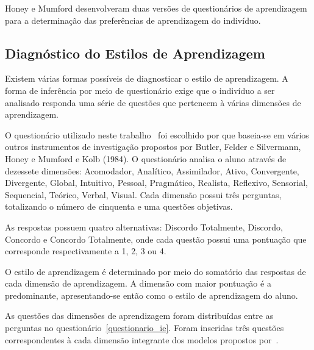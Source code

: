 Honey e Mumford desenvolveram duas versões de questionários de aprendizagem~\cite{honey2000} para a determinação das preferências de aprendizagem do indivíduo.

\subsection{Diagnóstico do Estilos de Aprendizagem}
Existem várias formas possíveis de diagnosticar o estilo de aprendizagem. A forma de inferência por meio de questionário exige que o indivíduo a ser analisado responda uma série de questões que pertencem à várias dimensões de aprendizagem.

O questionário utilizado neste trabalho~\cite{muhlbeier12} foi escolhido por que baseia-se em vários outros instrumentos de investigação propostos por Butler, Felder e Silvermann, Honey e Mumford e Kolb (1984). O questionário analisa o aluno através de dezessete dimensões: Acomodador, Analítico, Assimilador, Ativo, Convergente, Divergente, Global, Intuitivo, Pessoal, Pragmático, Realista, Reflexivo, Sensorial, Sequencial, Teórico, Verbal, Visual. Cada dimensão possui três perguntas, totalizando o número de cinquenta e uma questões objetivas.

As respostas possuem quatro alternativas: Discordo Totalmente, Discordo, Concordo e Concordo Totalmente, onde cada questão possui uma pontuação que corresponde respectivamente a 1, 2, 3 ou 4.

O estilo de aprendizagem é determinado por meio do somatório das respostas de cada dimensão de aprendizagem. A dimensão com maior pontuação é a predominante, apresentando-se então como o estilo de aprendizagem do aluno. 

As questões das dimensões de aprendizagem foram distribuídas entre as perguntas no questionário~\ref{questionario_ie}. Foram inseridas três questões correspondentes à cada dimensão integrante dos modelos propostos por~\cite{muhlbeier12}.

